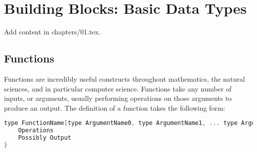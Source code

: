 \chapter{Building Blocks: Basic Data Types}
\lstset{style=BrenMat}

Add content in chapters/01.tex.

\section{Functions}
Functions are incredibly useful constructs throughout mathematics, the natural sciences, and in particular
computer science. Functions take any number of inputs, or arguments, usually performing operations on those arguments to
produce an output. The definition of a function takes the following form:
\begin{center}
\begin{lstlisting}[language=C,caption=Function Example,label=lst:funcEx]
type FunctionName[type ArgumentName0, type ArgumentName1, ... type ArgumentNameN]{
	Operations
	Possibly Output
}
\end{lstlisting}
\end{center}

